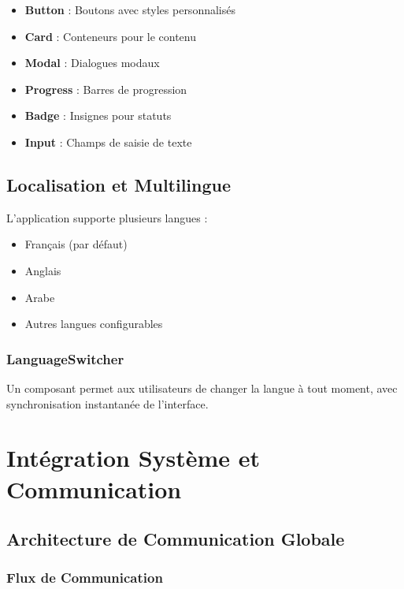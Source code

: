 \documentclass[12pt,a4paper,oneside]{report}
\begin{document}
\begin{itemize}
  \item \textbf{Button} : Boutons avec styles personnalisés
  \item \textbf{Card} : Conteneurs pour le contenu
  \item \textbf{Modal} : Dialogues modaux
  \item \textbf{Progress} : Barres de progression
  \item \textbf{Badge} : Insignes pour statuts
  \item \textbf{Input} : Champs de saisie de texte
\end{itemize}

\section{Localisation et Multilingue}

L'application supporte plusieurs langues :

\begin{itemize}
  \item Français (par défaut)
  \item Anglais
  \item Arabe
  \item Autres langues configurables
\end{itemize}

\subsection{LanguageSwitcher}

Un composant permet aux utilisateurs de changer la langue à tout moment, avec synchronisation instantanée de l'interface.

\newpage

\chapter{Intégration Système et Communication}

\section{Architecture de Communication Globale}

\subsection{Flux de Communication}
\end{document}
